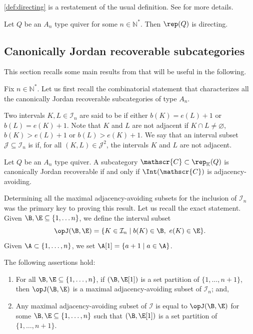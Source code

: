     \cref{def:directing} is a restatement of the usual definition. See \cite{ASS06} for more details.

    \begin{theorem} \label{thm:Andirecting}
        Let $Q$ be an $A_n$ type quiver for some $n \in \mathbb{N}^*$. Then $\rep(Q)$ is directing.
    \end{theorem}

    \subsection{Canonically Jordan recoverable subcategories}
    \label{ss:AllCJRtypeA}

    This section recalls some main results from \cite{D23} that will be useful in the following.

    Fix $n \in \mathbb{N}^*$. Let us first recall the combinatorial statement that characterizes all the canonically Jordan recoverable subcategories of type $A_n$.

    Two intervals $K,L \in \mathcal{I}_n$ are said to be  if either $b(K) = e(L)+1$ or $b(L) = e(K)+1$. Note that $K$ and $L$ are not adjacent if $K \cap L \neq \varnothing$, $b(K) > e(L)+1$ or $b(L) > e(K)+1$. We say that an interval subset $\mathscr{J} \subseteq \mathcal{I}_n$ is  if, for all $(K,L) \in \mathscr{J}^2$, the intervals $K$ and $L$ are not adjacent.

\begin{theorem} \label{thm:typeACJRcombi}Let $Q$ be an $A_n$ type quiver. A subcategory $\mathscr{C} \subset \rep_\mathbb{K}(Q)$ is canonically Jordan recoverable if and only if $\Int(\mathscr{C})$ is adjacency-avoiding.
\end{theorem}

Determining all the maximal adjacency-avoiding subsets for the inclusion of $\mathcal{I}_n$ was the primary key to proving this result. Let us recall the exact statement. Given $\B, \E \subseteq \{1,\ldots n\}$, we define the interval subset \[\opJ(\B,\E) = \{K \in \mathcal{I}_n \mid b(K) \in \B,\ e(K) \in \E\}.\] Given $\A \subset\{1,\ldots,n\}$, we set $\A[1] = \{a+1 \mid a \in \A\}$.

\begin{prop} \label{prop:allmaxadjavo} The following assertions hold:
    \begin{enumerate}[label = $(\roman*)$,itemsep=1mm]
        \item For all $\B,\E \subseteq \{1,\ldots,n\}$, if $(\B,\E[1])$ is a set partition of $\{1,\ldots,n+1\}$, then $\opJ(\B,\E)$ is a maximal adjacency-avoiding subset of $\mathcal{I}_n$; and,
        \item Any maximal adjacency-avoiding subset of $\mathcal{I}$ is equal to $\opJ(\B,\E)$ for some $\B,\E \subseteq \{1,\ldots,n\}$ such that $(\B,\E[1])$ is a set partition of $\{1,\ldots,n+1\}$.
    \end{enumerate}
\end{prop}

